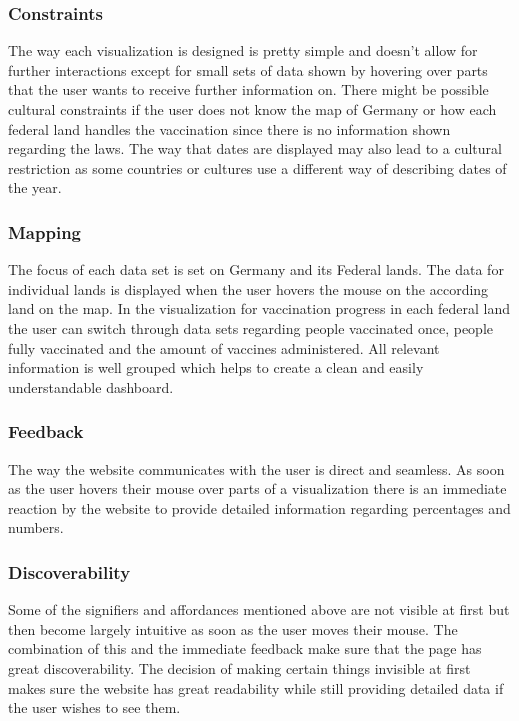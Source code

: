 \documentclass[12pt, letterpaper]{article}
\begin{document}
\subsubsection{Constraints}
The way each visualization is designed is pretty simple and doesn't allow for further interactions except for small sets of data shown by hovering over parts that the user wants to receive further information on. There might be possible cultural constraints if the user does not know the map of Germany or how each federal land handles the vaccination since there is no information shown regarding the laws. The way that dates are displayed may also lead to a cultural restriction as some countries or cultures use a different way of describing dates of the year.

\subsubsection{Mapping}
The focus of each data set is set on Germany and its Federal lands. The data for individual lands is displayed when the user hovers the mouse on the according land on the map. In the visualization for vaccination progress in each federal land the user can switch through data sets regarding people vaccinated once, people fully vaccinated and the amount of vaccines administered. All relevant information is well grouped which helps to create a clean and easily understandable dashboard.

\subsubsection{Feedback}
The way the website communicates with the user is direct and seamless. As soon as the user hovers their mouse over parts of a visualization there is an immediate reaction by the website to provide detailed information regarding percentages and numbers.

\subsubsection{Discoverability}
Some of the signifiers and affordances mentioned above are not visible at first but then become largely intuitive as soon as the user moves their mouse. The combination of this and the immediate feedback make sure that the page has great discoverability. The decision of making certain things invisible at first makes sure the website has great readability while still providing detailed data if the user wishes to see them.
\end{document}
